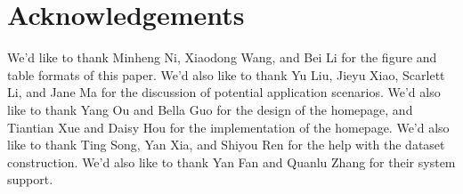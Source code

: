 \documentclass{article}
\begin{document}
\section*{Acknowledgements}

We'd like to thank Minheng Ni, Xiaodong Wang, and Bei Li for the figure and table formats of this paper. We'd also like to thank Yu Liu, Jieyu Xiao, Scarlett Li, and Jane Ma for the discussion of potential application scenarios. We'd also like to thank Yang Ou and Bella Guo for the design of the homepage, and Tiantian Xue and Daisy Hou for the implementation of the homepage. We'd also like to thank Ting Song, Yan Xia, and Shiyou Ren for the help with the dataset construction. We'd also like to thank Yan Fan and Quanlu Zhang for their system support.








\end{document}
